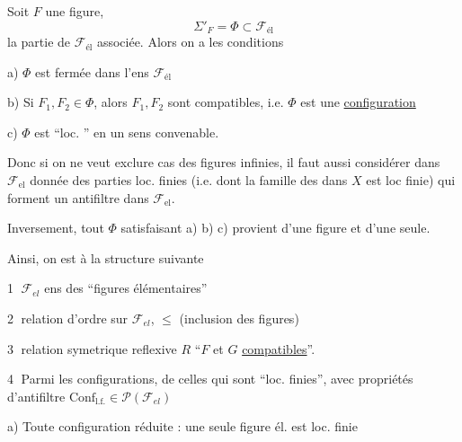 Soit $F$ une figure, 
\[
\Sigma'_F=\Phi\subset\mathcal{F}_{\text{él}}
\]
la partie de $\mathcal{F}_{\text{él}}$ associée. Alors on a les conditions

a) $\Phi$ est fermée dans l'ens  $\mathcal{F}_{\text{él}}$

b) Si  $F_1,F_2\in\Phi$,  alors $F_1,F_2$ sont compatibles, i.e. $\Phi$ est une \uline{configuration}

c) $\Phi$ est ``loc. '' en un sens convenable.

Donc si on ne veut exclure  cas des figures infinies, il faut aussi considérer dans $\mathcal{F}_{\text{el}}$  donnée des parties loc. finies (i.e. dont la famille des  dans $X$ est loc finie) qui forment un antifiltre dans $\mathcal{F}_{\text{el}}$.

Inversement, tout $\Phi$ satisfaisant a) b) c) provient d'une figure et d'une seule.


Ainsi, on est  à la structure suivante

\textcircled{1} $\mathcal{F}_{el}$ ens des ``figures élémentaires''

\textcircled{2} relation d'ordre sur $\mathcal{F}_{el}$, $\leq$ (inclusion des figures)

\textcircled{3} relation symetrique reflexive $R$  ``$F$ et $G$ \uline{compatibles}''.\  



\textcircled{4}  Parmi les configurations,      de celles qui sont ``loc. finies'', avec  propriétés d'antifiltre \unsure{;|,} $\mathrm{Conf}_{\mathrm{l.f.}}\in\mathcal{P}(\mathcal{F}_{el})$

a) Toute configuration réduite : une seule figure él. est loc. finie

